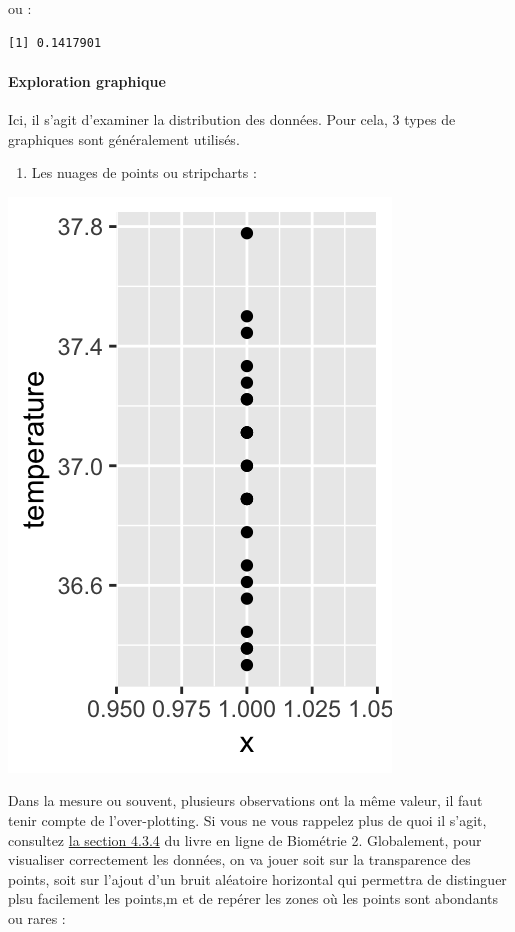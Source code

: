 \documentclass[a4paperpaper,]{article}
\newenvironment{Shaded}{\begin{snugshade}}{\end{snugshade}}
\newcommand{\DataTypeTok}[1]{\textcolor[rgb]{0.00,0.34,0.68}{#1}}
\newcommand{\DecValTok}[1]{\textcolor[rgb]{0.69,0.50,0.00}{#1}}
\newcommand{\KeywordTok}[1]{\textcolor[rgb]{0.12,0.11,0.11}{\textbf{#1}}}
\newcommand{\NormalTok}[1]{\textcolor[rgb]{0.12,0.11,0.11}{#1}}
\newcommand{\OperatorTok}[1]{\textcolor[rgb]{0.12,0.11,0.11}{#1}}
\newcommand{\StringTok}[1]{\textcolor[rgb]{0.75,0.01,0.01}{#1}}
\providecommand{\tightlist}{%
  \setlength{\itemsep}{0pt}\setlength{\parskip}{0pt}}
\let\oldparagraph\paragraph
\renewcommand{\paragraph}[1]{\oldparagraph{#1}\mbox{}}
\begin{document}
ou :

\begin{Shaded}
\end{Shaded}

\begin{verbatim}
[1] 0.1417901
\end{verbatim}

\hypertarget{exploration-graphique}{%
\paragraph{Exploration graphique}\label{exploration-graphique}}

Ici, il s'agit d'examiner la distribution des données. Pour cela, 3 types de graphiques sont généralement utilisés.

\begin{enumerate}
\def\labelenumi{\arabic{enumi}.}
\tightlist
\item
  Les nuages de points ou stripcharts :
\end{enumerate}

\begin{Shaded}
\end{Shaded}

\begin{center}\includegraphics[width=0.25\linewidth]{figure/unnamed-chunk-15-1} \end{center}

Dans la mesure ou souvent, plusieurs observations ont la même valeur, il faut tenir compte de l'over-plotting. Si vous ne vous rappelez plus de quoi il s'agit, consultez \href{https://besibo.github.io/DA/viz.html\#over-plotting}{la section 4.3.4} du livre en ligne de Biométrie 2. Globalement, pour visualiser correctement les données, on va jouer soit sur la transparence des points, soit sur l'ajout d'un bruit aléatoire horizontal qui permettra de distinguer plsu facilement les points,m et de repérer les zones où les points sont abondants ou rares :
\end{document}
